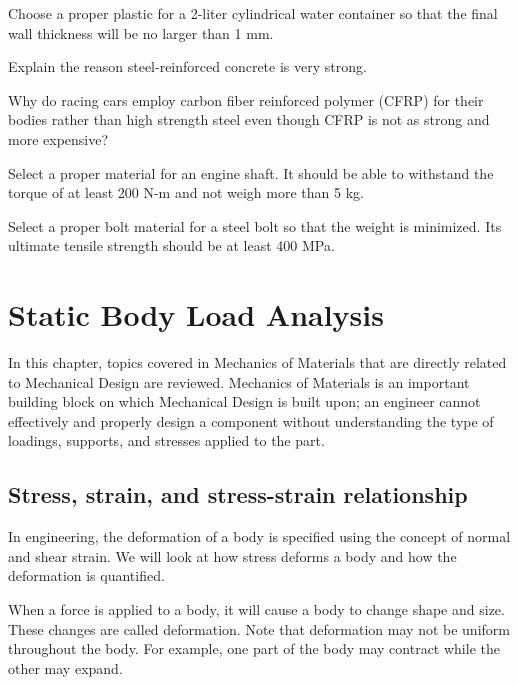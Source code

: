 \documentclass[
10pt,
a4paper,
openany,
svgnames,
]{book}
\newcommand{\exercise}{%
\item \label{lab:\arabic{chapter}-\arabic{exercisesi}}  %
}
\begin{document}
\begin{exercises}

  \exercise Choose a proper plastic for a 2-liter cylindrical water container so that the final wall thickness will be no larger than 1 mm.

  \exercise Explain the reason steel-reinforced concrete is very strong.

  \exercise Why do racing cars employ carbon fiber reinforced polymer (CFRP) for their bodies rather than high strength steel even though CFRP is not as strong and more expensive?

  \exercise Select a proper material for an engine shaft. It should be able to withstand the torque of at least 200 N-m and not weigh more than 5 kg.

  \exercise Select a proper bolt material for a steel bolt so that the weight is minimized. Its ultimate tensile strength should be at least 400 MPa.

\end{exercises}


 
\chapter{Static Body Load Analysis}

In this chapter, topics covered in Mechanics of Materials that are directly related to Mechanical Design are reviewed. Mechanics of Materials is an important building block on which Mechanical Design is built upon; an engineer cannot effectively and properly design a component without understanding the type of loadings, supports, and stresses applied to the part.

\section{Stress, strain, and stress-strain relationship}

In engineering, the deformation of a body is specified using the concept of normal and shear strain. We will look at how stress deforms a body and how the deformation is quantified.

When a force is applied to a body, it will cause a body to change shape and size. These changes are called deformation. Note that deformation may not be uniform throughout the body. For example, one part of the body may contract while the other may expand.
\end{document}
